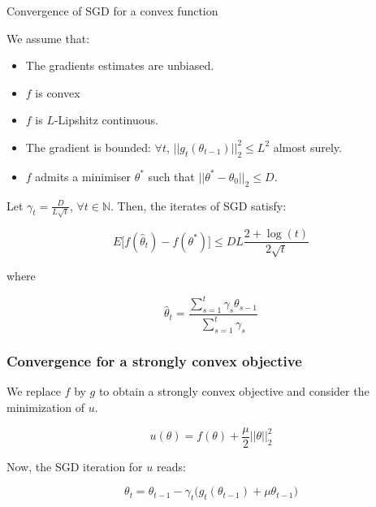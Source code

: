 \documentclass[
10pt, %
a4paper, %
oneside, %
headinclude,footinclude, %
BCOR5mm, %
]{scrartcl}
\begin{document}
\begin{theorem}{Convergence of SGD for a convex function}
    \label{th:sgdconvex}

    We assume that:
    \begin{itemize}
	\item The gradients estimates are unbiased.
        \item $f$ is convex
	\item $f$ is $L$-Lipshitz continuous.
	\item The gradient is bounded: $\forall t$, $||g_t(\theta_{t-1})||_2^2\leq L^2$ almost surely.
	\item $f$ admits a minimiser $ \theta^*$ such that $||\theta^*-\theta_0||_2\leq D$.
    \end{itemize}

    Let $\gamma_t = \frac{D}{L \sqrt{t} } $, $\forall t\in \mathbb{N} $. Then, the iterates of SGD satisfy:

    \begin{equation}
	E\big[f( \hat{\theta}_t)-f(\theta^*)\big]\leq DL \frac{2+\log(t)}{2 \sqrt{t} }
    \end{equation}

    where 

    \begin{equation}
	\hat{\theta}_t = \frac{ \sum^{t}_{s=1} \gamma_s\theta_{s-1}}{ \sum^{t}_{s=1} \gamma_s} 
    \end{equation}

\end{theorem}

\subsubsection{\large\color{Periwinkle}Convergence for a strongly convex objective}

We replace $f$ by $g$ to obtain a strongly convex objective and consider the minimization of $u$.

\begin{equation*}
    u(\theta) = f(\theta)+ \frac{\mu}{2} ||\theta||_2^2
\end{equation*}

Now, the SGD iteration for $u$ reads:

\begin{equation}
    \label{eq:udate}
    \theta_t = \theta_{t-1}- \gamma_t\big(g_t(\theta_{t-1})+\mu \theta_{t-1}\big)
\end{equation}
\end{document}
